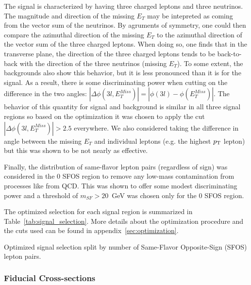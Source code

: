 The signal is characterized by having three charged leptons and three neutrinos.  The magnitude and direction
of the missing $E_{T}$ may be intepreted as coming from the vector sum of the neutrinos.  By agruments of 
symmetry, one could then compare the azimuthal direction of the missing $E_{T}$ to the azimuthal direction of the vector
sum of the three charged leptons. When doing so, one finds that in the transverse plane, 
the direction of the three charged leptons
tends to be back-to-back with the direction of the three neutrinos (missing $E_{T}$). To some extent, the
backgrounds also show this behavior, but it is less pronounced than it is for the signal.  As a result, 
there is some discriminating power when cutting on the difference in the two angles: 
$|\Delta\phi(3l,E_{T}^{Miss})| = |\phi(3l)-\phi(E_{T}^{Miss})|$. The behavior of this quantity for signal and
background is similar in all three signal regions so based on the optimization it was chosen to apply the cut
$|\Delta\phi(3l,E_{T}^{Miss})| > 2.5$ everywhere.  We also considered taking the difference in angle between
the missing $E_{T}$ and individual leptons (e.g. the highest $p_{\mathrm{T}}$ lepton) but this was shown to be not 
nearly as effective.  

Finally, the distribution of same-flavor lepton pairs (regardless of sign) was considered in the 0 SFOS 
region to remove any low-mass contamination from processes like from QCD.  This was shown to offer some
modest discriminating power and a threshold of $m_{SF} > 20$~GeV was chosen only for the 0 SFOS region.


The optimized selection for each signal region is summarized in Table~\ref{tab:signal_selection}.
More details about the optimization procedure and the cuts used 
can be found in appendix~\ref{sec:optimization}.

\begin{table}[ht!]
\centering
\begin{small}

\end{small}
\caption{Optimized signal selection split by number of Same-Flavor Opposite-Sign (SFOS) lepton pairs.}
\label{tab:signal_selection}
\end{table}

\clearpage
\subsubsection{Fiducial Cross-sections}
\label{sec:fiducial_cross_section}


